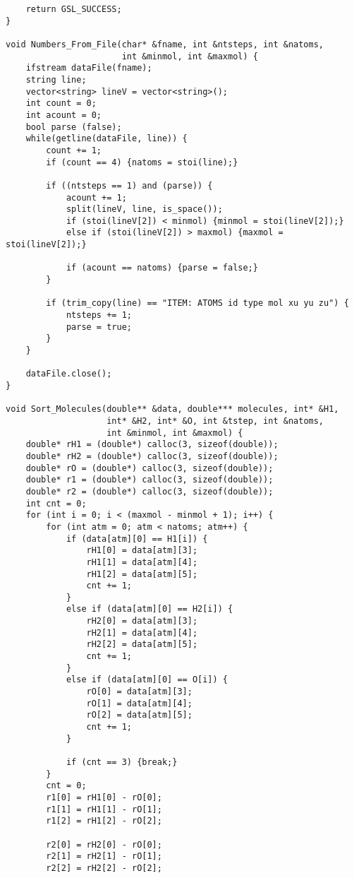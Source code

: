 \begin{singlespace}
\begin{verbatim}
    return GSL_SUCCESS;
}

void Numbers_From_File(char* &fname, int &ntsteps, int &natoms, 
                       int &minmol, int &maxmol) {
    ifstream dataFile(fname);
    string line;
    vector<string> lineV = vector<string>();
    int count = 0;
    int acount = 0;
    bool parse (false);
    while(getline(dataFile, line)) {
        count += 1;
        if (count == 4) {natoms = stoi(line);}

        if ((ntsteps == 1) and (parse)) {
            acount += 1;
            split(lineV, line, is_space());
            if (stoi(lineV[2]) < minmol) {minmol = stoi(lineV[2]);}
            else if (stoi(lineV[2]) > maxmol) {maxmol = stoi(lineV[2]);}

            if (acount == natoms) {parse = false;}
        }

        if (trim_copy(line) == "ITEM: ATOMS id type mol xu yu zu") {
            ntsteps += 1;
            parse = true;
        }
    }

    dataFile.close();
}

void Sort_Molecules(double** &data, double*** molecules, int* &H1, 
                    int* &H2, int* &O, int &tstep, int &natoms, 
                    int &minmol, int &maxmol) {
    double* rH1 = (double*) calloc(3, sizeof(double));
    double* rH2 = (double*) calloc(3, sizeof(double));
    double* rO = (double*) calloc(3, sizeof(double));
    double* r1 = (double*) calloc(3, sizeof(double));
    double* r2 = (double*) calloc(3, sizeof(double));
    int cnt = 0;
    for (int i = 0; i < (maxmol - minmol + 1); i++) {
        for (int atm = 0; atm < natoms; atm++) {
            if (data[atm][0] == H1[i]) {
                rH1[0] = data[atm][3];
                rH1[1] = data[atm][4];
                rH1[2] = data[atm][5];
                cnt += 1;
            }
            else if (data[atm][0] == H2[i]) {
                rH2[0] = data[atm][3];
                rH2[1] = data[atm][4];
                rH2[2] = data[atm][5];
                cnt += 1;
            }
            else if (data[atm][0] == O[i]) {
                rO[0] = data[atm][3];
                rO[1] = data[atm][4];
                rO[2] = data[atm][5];
                cnt += 1;
            }

            if (cnt == 3) {break;}
        }
        cnt = 0;
        r1[0] = rH1[0] - rO[0];
        r1[1] = rH1[1] - rO[1];
        r1[2] = rH1[2] - rO[2];

        r2[0] = rH2[0] - rO[0];
        r2[1] = rH2[1] - rO[1];
        r2[2] = rH2[2] - rO[2];


\end{verbatim}
\end{singlespace}
